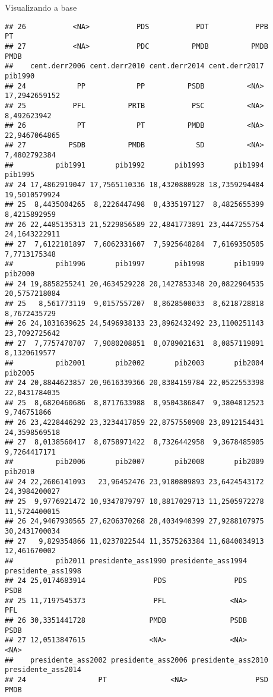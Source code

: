 \documentclass[
  10pt,
  ignorenonframetext,
]{beamer}
\begin{document}
\begin{frame}[fragile]{Visualizando a base}
\begin{verbatim}
## 26           <NA>           PDS           PDT           PPB            PT
## 27           <NA>           PDC          PMDB          PMDB          PMDB
##    cent.derr2006 cent.derr2010 cent.derr2014 cent.derr2017       pib1990
## 24            PP            PP          PSDB          <NA> 17,2942659152
## 25           PFL          PRTB           PSC          <NA>   8,492623942
## 26            PT            PT          PMDB          <NA> 22,9467064865
## 27          PSDB          PMDB            SD          <NA>  7,4802792384
##          pib1991       pib1992       pib1993       pib1994       pib1995
## 24 17,4862919047 17,7565110336 18,4320880928 18,7359294484 19,5010579924
## 25  8,4435004265  8,2226447498  8,4335197127  8,4825655399  8,4215892959
## 26 22,4485135313 21,5229856589 22,4841773891 23,4447255754 24,1643222911
## 27  7,6122181897  7,6062331607  7,5925648284  7,6169350505  7,7713175348
##          pib1996       pib1997       pib1998       pib1999       pib2000
## 24 19,8858255241 20,4634529228 20,1427853348 20,0822904535 20,5757218084
## 25   8,561773119  9,0157557207  8,8628500033  8,6218728818  8,7672435729
## 26 24,1031639625 24,5496938133 23,8962432492 23,1100251143 23,7092725642
## 27  7,7757470707  7,9080208851  8,0789021631  8,0857119891  8,1320619577
##          pib2001       pib2002       pib2003       pib2004       pib2005
## 24 20,8844623857 20,9616339366 20,8384159784 22,0522553398 22,0431784035
## 25  8,6820460686  8,8717633988  8,9504386847  9,3804812523   9,746751866
## 26 23,4228446292 23,3234417859 22,8757550908 23,8912154431 24,3598569518
## 27  8,0138560417  8,0758971422  8,7326442958  9,3678485905  9,7264417171
##          pib2006       pib2007       pib2008       pib2009       pib2010
## 24 22,2606141093   23,96452476 23,9180809893 23,6424543172 24,3984200027
## 25  9,9776921472 10,9347879797 10,8817029713 11,2505972278 11,5724400015
## 26 24,9467930565 27,6206370268 28,4034940399 27,9288107975 30,2431700034
## 27   9,829354866 11,0237822544 11,3575263384 11,6840034913  12,461670002
##          pib2011 presidente_ass1990 presidente_ass1994 presidente_ass1998
## 24 25,0174683914                PDS                PDS               PSDB
## 25 11,7197545373                PFL               <NA>                PFL
## 26 30,3351441728               PMDB               PSDB               PSDB
## 27 12,0513847615               <NA>               <NA>               <NA>
##    presidente_ass2002 presidente_ass2006 presidente_ass2010 presidente_ass2014
## 24                 PT               <NA>                PSD               PMDB

\end{verbatim}
\end{frame}
\end{document}
